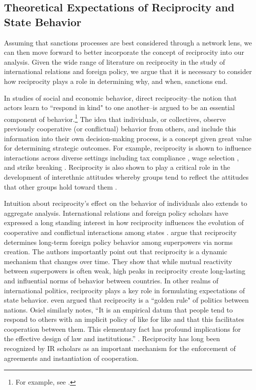 \subsection*{Theoretical Expectations of Reciprocity and State Behavior}
Assuming that sanctions processes are best considered through a network lens, we can then move forward to better incorporate the concept of reciprocity into our analysis. Given the wide range of literature on reciprocity in the study of international relations and foreign policy, we argue that it is necessary to consider how reciprocity plays a role in determining why, and when, sanctions end.

In studies of social and economic behavior, direct reciprocity--the notion that actors learn to ``respond in kind" to one another--is argued to be an essential component of behavior.\footnote{For example, see \cite{bolton:1998, charness:2002, charness:2004, cox:2007, cox:2004}.} The idea that individuals, or collectives, observe previously cooperative (or conflictual) behavior from others, and include this information into their own decision-making process, is a concept given great value for determining strategic outcomes. For example, reciprocity is shown to influence interactions across diverse settings including tax compliance \citep{smith:1990}, wage selection \citep{campbell:1997}, and strike breaking \citep{brett:1998}. Reciprocity is also shown to play a critical role in the development of interethnic attitudes whereby groups tend to reflect the attitudes that other groups hold toward them \citep{berry:1979}. 

Intuition about reciprocity's effect on the behavior of individuals also extends to aggregate analysis. International relations and foreign policy scholars have expressed a long standing interest in how reciprocity influences the evolution of cooperative and conflictual interactions among states \citep{richardson1960, keohane1989reciprocity}. \cite{rajmaira:1990} argue that reciprocity determines long-term foreign policy behavior among superpowers via norms creation. The authors importantly point out that reciprocity is a dynamic mechanism that changes over time. They show that while mutual reactivity between superpowers is often weak, high peaks in reciprocity create long-lasting and influential norms of behavior between countries. In other realms of international politics, reciprocity plays a key role in formulating expectations of state behavior. \cite{ward1981} even argued that reciprocity is a ``golden rule" of politics between nations.  Osiel similarly notes, ``It is an empirical datum that people tend to respond to others with an implicit policy of like for like and that this facilitates cooperation between them. This elementary fact has profound implications for the effective design of law and institutions.'' \cite[p. 19]{osiel:2009}. Reciprocity has long been recognized by IR scholars as an important mechanism for the enforcement of agreements and instantiation of cooperation. 

